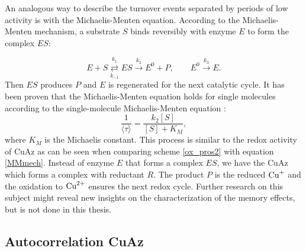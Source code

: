 \documentclass[twoside,single]{lion-msc}
\begin{document}
An analogous way to describe the turnover events separated by periods of low activity is with the Michaelis-Menten equation. According to the Michaelis-Menten mechanism, a substrate $S$ binds reversibly with enzyme $E$ to form the complex $ES$:

\begin{equation}\label{MMmech}
E + S \overset{k_{1}}{\underset{k_{-1}}\rightleftarrows} ES \overset{k_{2}}\rightarrow E^{0} + P,  \qquad E^{0} \overset{k_{3}}\rightarrow E.
\end{equation}
Then $ES$ produces $P$ and $E$ is regenerated for the next catalytic cycle. It has been proven that the Michaelis-Menten equation holds for single molecules according to the single-molecule Michaelis-Menten equation \cite{English2006}:
\begin{equation}\label{MMmech1}
\frac{1}{\langle \tau \rangle} = \frac{k_{2}[S]}{[S]+K_{M}},
\end{equation}
 where $K_{M}$ is the Michaelis constant. This process is similar to the redox activity of CuAz as can be seen when comparing scheme \ref{ox_pros2} with equation \ref{MMmech}. Instead of enzyme $E$ that forms a complex $ES$, we have the CuAz which forms a complex with reductant $R$. The product $P$ is the reduced $\textup{Cu}^{+}$ and the oxidation to $\textup{Cu}^{2+}$ ensures the next redox cycle. Further research on this subject might reveal new insights on the characterization of the memory effects, but is not done in this thesis.


\subsection{Autocorrelation CuAz} \label{autocor}
\end{document}
